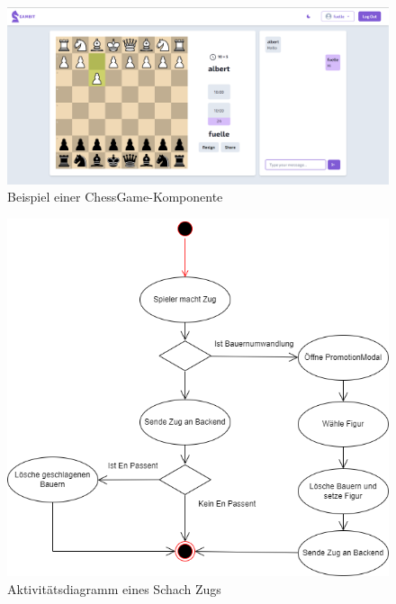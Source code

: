 \documentclass[a4paper,12pt]{report}
\begin{document}
      \begin{figure}[ht]
      \centering
  \includegraphics[width=160mm]{ChessGame.png}
  \caption{Beispiel einer ChessGame-Komponente}
  \label{fig:chess-game}
\end{figure}

      \begin{figure}[ht]
      \centering
  \includegraphics[width=120mm]{Interaktion Schach Zug.png}
  \caption{Aktivitätsdiagramm eines Schach Zugs}
  \label{fig:chess-move}
\end{figure}




\end{document}
